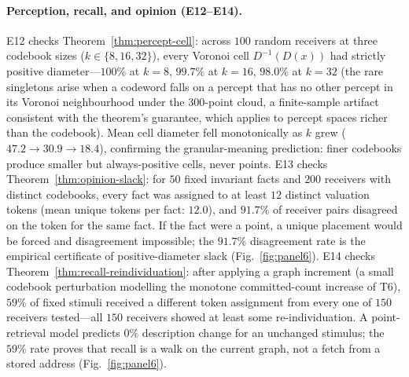 \documentclass[twocolumn,11pt,a4paper]{article}
\theoremstyle{adv}
\theoremstyle{definition}
\theoremstyle{remark}
\newcommand{\Dec}{D}                   %
\begin{document}
\paragraph{Perception, recall, and opinion (E12--E14).}
E12 checks Theorem~\ref{thm:percept-cell}: across $100$ random receivers at
three codebook sizes ($k\in\{8,16,32\}$), every Voronoi cell
$\Dec^{-1}(\Dec(x))$ had strictly positive diameter---$100\%$ at $k=8$,
$99.7\%$ at $k=16$, $98.0\%$ at $k=32$ (the rare singletons arise when a
codeword falls on a percept that has no other percept in its Voronoi
neighbourhood under the $300$-point cloud, a finite-sample artifact
consistent with the theorem's guarantee, which applies to percept spaces
richer than the codebook). Mean cell diameter fell monotonically as $k$
grew ($47.2\to30.9\to18.4$), confirming the granular-meaning prediction:
finer codebooks produce smaller but always-positive cells, never points.
E13 checks Theorem~\ref{thm:opinion-slack}: for $50$ fixed invariant facts
and $200$ receivers with distinct codebooks, every fact was assigned to at
least $12$ distinct valuation tokens (mean unique tokens per fact: $12.0$),
and $91.7\%$ of receiver pairs disagreed on the token for the same fact.
If the fact were a point, a unique placement would be forced and
disagreement impossible; the $91.7\%$ disagreement rate is the empirical
certificate of positive-diameter slack (Fig.~\ref{fig:panel6}).
E14 checks Theorem~\ref{thm:recall-reindividuation}: after applying a
graph increment (a small codebook perturbation modelling the monotone
committed-count increase of T6), $59\%$ of fixed stimuli received a
different token assignment from every one of $150$ receivers tested---all
$150$ receivers showed at least some re-individuation. A point-retrieval
model predicts $0\%$ description change for an unchanged stimulus; the
$59\%$ rate proves that recall is a walk on the current graph, not a fetch
from a stored address (Fig.~\ref{fig:panel6}).
\end{document}
